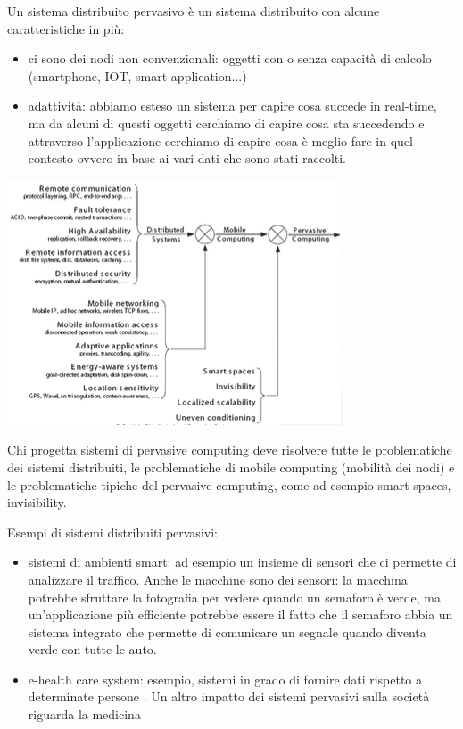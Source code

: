 Un sistema distribuito pervasivo è un sistema distribuito con alcune caratteristiche in più: 
\begin{itemize}
    \item ci sono dei nodi non convenzionali: oggetti con o senza capacità di calcolo (smartphone, IOT, smart application...)
    \item adattività: abbiamo esteso un sistema per capire cosa succede in real-time, ma da alcuni di questi oggetti cerchiamo di capire cosa sta succedendo e attraverso l'applicazione cerchiamo di capire cosa è meglio fare in quel contesto ovvero in base ai vari dati che sono stati raccolti. 
\end{itemize} 
\begin{center}
    \includegraphics[width = .7\textwidth]{images/lezione1/pervasive-problems.png}
\end{center}
Chi progetta sistemi di pervasive computing deve risolvere tutte le problematiche dei sistemi distribuiti, le problematiche di mobile computing (mobilità dei nodi) e le problematiche tipiche del pervasive computing, come ad esempio smart spaces, invisibility.

Esempi di sistemi distribuiti pervasivi: 
\begin{itemize}
    \item sistemi di ambienti smart: ad esempio un insieme di sensori che ci permette di analizzare il traffico.
    Anche le macchine sono dei sensori: la macchina potrebbe sfruttare la fotografia per vedere quando un semaforo è verde, ma un'applicazione più efficiente potrebbe essere il fatto che il semaforo abbia un sistema integrato che permette di comunicare un segnale quando diventa verde con tutte le auto.
    \item e-health care system: esempio, sistemi in grado di fornire dati rispetto a determinate persone . 
    Un altro impatto dei sistemi pervasivi sulla società riguarda la medicina
\end{itemize} 




